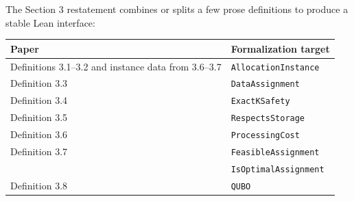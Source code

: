 \documentclass[11pt]{article}
\begin{document}
The Section 3 restatement combines or splits a few prose definitions to produce
a stable Lean interface:

\begin{center}
\begin{tabular}{@{}ll@{}}
\toprule
Paper & Formalization target \\
\midrule
Definitions 3.1--3.2 and instance data from 3.6--3.7
  & \texttt{AllocationInstance} \\
Definition 3.3 & \texttt{DataAssignment} \\
Definition 3.4 & \texttt{ExactKSafety} \\
Definition 3.5 & \texttt{RespectsStorage} \\
Definition 3.6 & \texttt{ProcessingCost} \\
Definition 3.7 & \texttt{FeasibleAssignment} \\
               & \texttt{IsOptimalAssignment} \\
Definition 3.8 & \texttt{QUBO} \\
\bottomrule
\end{tabular}
\end{center}




\end{document}
